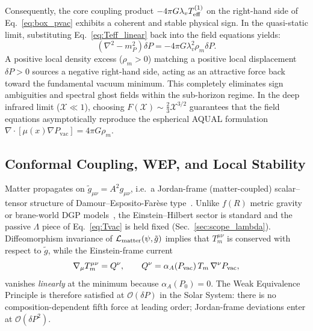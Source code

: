 \documentclass[prd,
               reprint,
               aps,
               preprintnumbers,
               nofootinbib,
               longbibliography,
               floatfix]{revtex4-2}
\begin{document}
Consequently, the core coupling product $-4\pi G \lambda_v T_{\rm eff}^{(1)}$
on the right-hand side of Eq.~\eqref{eq:box_pvac} exhibits a coherent 
and stable physical sign. In the quasi-static limit, substituting 
Eq.~\eqref{eq:Teff_linear} back into the field equations yields:
\begin{equation}
\label{eq:yukawa_stability}
\left(\nabla^2 - m_P^2\right)\delta P = -4\pi G \lambda_v^2 \rho_m \delta P.
\end{equation}
A positive local density excess ($\rho_m>0$) matching a positive local
displacement $\delta P>0$ sources a negative right-hand side, acting
as an attractive force back toward the fundamental vacuum minimum.
This completely eliminates sign ambiguities and spectral ghost fields 
within the sub-horizon regime. In the deep infrared limit ($\mathcal{X} \ll 1$), 
choosing $F(\mathcal{X}) \sim \frac{2}{3}\mathcal{X}^{3/2}$ guarantees that 
the field equations asymptotically reproduce the espherical AQUAL 
formulation $\nabla \cdot \left[ \mu(x) \nabla P_{\text{vac}} \right] = 4\pi G \rho_m$.


\subsection{Conformal Coupling, WEP, and Local Stability}
\label{sec:conformal_wep}

Matter propagates on $\tilde g_{\mu\nu}=A^2 g_{\mu\nu}$, i.e.\ a
Jordan-frame (matter-coupled) scalar--tensor structure of
Damour--Esposito-Far\`ese type~\cite{Damour1992,EspositoFarese2004,Will2014,Damour2010}.
Unlike $f(R)$ metric gravity~\cite{Sotiriou2010} or brane-world DGP
models~\cite{DGP2000}, the Einstein--Hilbert sector is standard and the
passive $\Lambda$ piece of Eq.~\eqref{eq:Tvac} is held fixed
(Sec.~\ref{sec:scope_lambda}).
Diffeomorphism invariance of $\mathcal{L}_{\rm matter}(\psi,\tilde g)$
implies that $T_m^{\mu\nu}$ is conserved with respect to $\tilde g$,
while the Einstein-frame current
\begin{equation}
\label{eq:exchange}
\nabla_\mu T_m^{\mu\nu}
=
Q^\nu,
\qquad
Q^\nu
=
\alpha_A(P_{\rm vac})\,T_m\,\nabla^\nu P_{\rm vac},
\end{equation}
vanishes \emph{linearly} at the minimum because $\alpha_A(P_0)=0$.
The Weak Equivalence Principle is therefore satisfied at $\mathcal{O}(\delta P)$
in the Solar System: there is no composition-dependent fifth force at
leading order; Jordan-frame deviations enter at $\mathcal{O}(\delta P^2)$.
\end{document}
